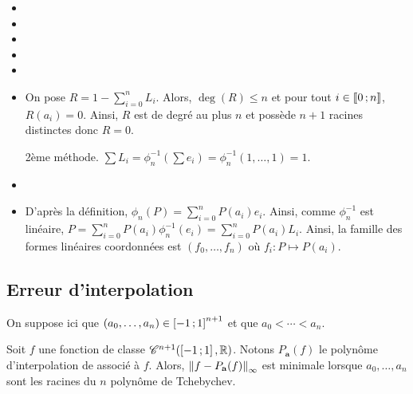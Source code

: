 \begin{solution}
\begin{itemize}
\item

\item

\item

\item

\item

\item On pose $R = 1 - \sum_{i=0}^n L_i$. Alors, $\deg(R) \leq n$ et pour tout $i \in \llbracket 0\,; n \rrbracket$, $R(a_i) = 0$. Ainsi, $R$ est de degré au plus $n$ et possède $n+1$ racines distinctes donc $R = 0$.


{2ème méthode.} $\sum L_i = \phi_n^{-1}(\sum e_i) = \phi_n^{-1}(1,\ldots,1) = 1$.

\item

\item D'après la définition, $\phi_n(P) = \sum_{i=0}^n P(a_i) e_i$. Ainsi, comme $\phi_n^{-1}$ est linéaire, $P = \sum_{i=0}^n P(a_i) \phi_n^{-1}(e_i) = \sum_{i=0}^n P(a_i) L_i$. Ainsi, la famille des formes linéaires coordonnées est $(f_0,\ldots,f_n)$ où $f_i : P \mapsto P(a_i)$.
\end{itemize}
\end{solution}



\subsection{Erreur d'interpolation}

On suppose ici que $(a_0,\ldots,a_n) \in \left[-1\,;1\right]^{n+1}$ et que $a_0 < \cdots < a_n$.

\begin{theo}
Soit $f$ une fonction de classe $\mathscr{C}^{n+1}(\left[-1\,;1\right],\mathbb{R})$. Notons $P_{\mathbf{a}}(f)$ le polynôme d'interpolation de  associé à $f$. Alors, $\norm{f - P_{\mathbf{a}}(f)}_\infty$ est minimale lorsque $a_0,\ldots,a_n$ sont les racines du $n$\ieme{} polynôme de Tchebychev.
\end{theo}


